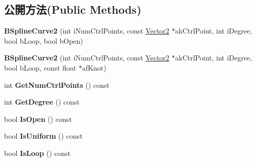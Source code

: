 \subsection*{公開方法(Public Methods)}
\begin{DoxyCompactItemize}
\item 
{\bfseries B\+Spline\+Curve2} (int i\+Num\+Ctrl\+Points, const \hyperlink{class_i_dream_sky_1_1_vector2}{Vector2} $\ast$ak\+Ctrl\+Point, int i\+Degree, bool b\+Loop, bool b\+Open)\hypertarget{class_i_dream_sky_1_1_b_spline_curve2_aa3df19fa9a15fcb8e03a367bd1e0b1e3}{}\label{class_i_dream_sky_1_1_b_spline_curve2_aa3df19fa9a15fcb8e03a367bd1e0b1e3}

\item 
{\bfseries B\+Spline\+Curve2} (int i\+Num\+Ctrl\+Points, const \hyperlink{class_i_dream_sky_1_1_vector2}{Vector2} $\ast$ak\+Ctrl\+Point, int i\+Degree, bool b\+Loop, const float $\ast$af\+Knot)\hypertarget{class_i_dream_sky_1_1_b_spline_curve2_ab74a2b348695d033eb10f40e71cd2cc4}{}\label{class_i_dream_sky_1_1_b_spline_curve2_ab74a2b348695d033eb10f40e71cd2cc4}

\item 
int {\bfseries Get\+Num\+Ctrl\+Points} () const \hypertarget{class_i_dream_sky_1_1_b_spline_curve2_ab28205b92d3bd956cf3d61d6ca2e827c}{}\label{class_i_dream_sky_1_1_b_spline_curve2_ab28205b92d3bd956cf3d61d6ca2e827c}

\item 
int {\bfseries Get\+Degree} () const \hypertarget{class_i_dream_sky_1_1_b_spline_curve2_ae03822ad54e3fafecc7fa64289668505}{}\label{class_i_dream_sky_1_1_b_spline_curve2_ae03822ad54e3fafecc7fa64289668505}

\item 
bool {\bfseries Is\+Open} () const \hypertarget{class_i_dream_sky_1_1_b_spline_curve2_a8c5cc13dc6c832ed97dc29761860e53f}{}\label{class_i_dream_sky_1_1_b_spline_curve2_a8c5cc13dc6c832ed97dc29761860e53f}

\item 
bool {\bfseries Is\+Uniform} () const \hypertarget{class_i_dream_sky_1_1_b_spline_curve2_aa0ba54e1ce55b4258895ffd3ce4ae0ec}{}\label{class_i_dream_sky_1_1_b_spline_curve2_aa0ba54e1ce55b4258895ffd3ce4ae0ec}

\item 
bool {\bfseries Is\+Loop} () const \hypertarget{class_i_dream_sky_1_1_b_spline_curve2_a47d905bdb8c3e38a3258d2c00d6db99d}{}\label{class_i_dream_sky_1_1_b_spline_curve2_a47d905bdb8c3e38a3258d2c00d6db99d}


\end{DoxyCompactItemize}
